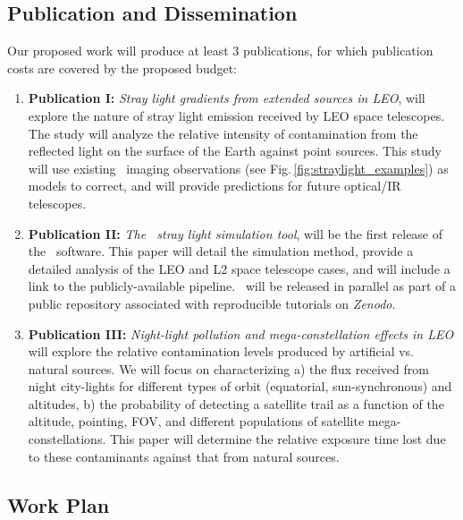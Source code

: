 \documentclass[usenames,dvipsnames,modern]{CLASS_FILES/aastex631}  %
\begin{document}
\subsection{Publication and Dissemination}

Our proposed work will produce at least 3 publications, for which publication costs are covered by the proposed budget: 
\begin{enumerate}
    \item \textbf{Publication I:} \emph{Stray light gradients from extended sources in LEO}, will explore the nature of stray light emission received by LEO space telescopes. The study will analyze the relative intensity of contamination from the reflected light on the surface of the Earth against point sources. This study will use existing \HST\ imaging observations (see Fig.\,\ref{fig:straylight_examples}) as models to correct, and will provide predictions for future optical/IR telescopes.
    
    \item  \textbf{Publication II:} \emph{The \MyName\ stray light simulation tool}, will be the first release of the \MyName\ software. This paper will detail the simulation method, provide a detailed analysis of the LEO and L2 space telescope cases, and will include a link to the publicly-available pipeline. \MyName\ will be released in parallel as part of a public repository associated with reproducible tutorials on \emph{Zenodo}.
    
     \item \textbf{Publication III:} \emph{Night-light pollution and mega-constellation effects in LEO} will explore the relative contamination levels produced by artificial vs. natural sources. We will focus on characterizing a) the flux received from night city-lights for different types of orbit (equatorial, sun-synchronous) and altitudes, b) the probability of detecting a satellite trail as a function of the altitude, pointing, FOV, and different populations of satellite mega-constellations. This paper will determine the relative exposure time lost due to these contaminants against that from natural sources. 
\end{enumerate}

\subsection{Work Plan}
\label{subsec:timeline}
\vspace{0.2cm}
\end{document}
